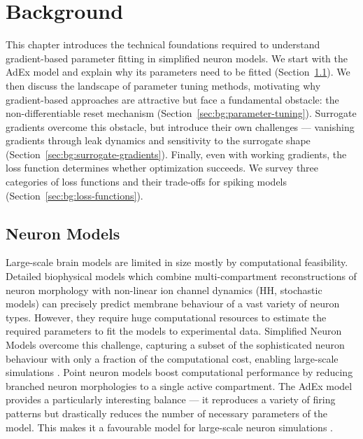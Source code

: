 \section{Background}\label{ch:background}
\glsresetall
This chapter introduces the technical foundations required to understand gradient-based parameter fitting in simplified neuron models.
We start with the \gls{AdEx} model and explain why its parameters need to be fitted (Section~\ref{sec:bg:neuron-models}).
We then discuss the landscape of parameter tuning methods, motivating why gradient-based approaches are attractive but face a fundamental obstacle:
the non-differentiable reset mechanism (Section~\ref{sec:bg:parameter-tuning}).
Surrogate gradients overcome this obstacle, but introduce their own challenges --- vanishing gradients through leak dynamics and sensitivity to the surrogate shape (Section~\ref{sec:bg:surrogate-gradients}).
Finally, even with working gradients, the loss function determines whether optimization succeeds.
We survey three categories of loss functions and their trade-offs for spiking models (Section~\ref{sec:bg:loss-functions}).

\subsection{Neuron Models}\label{sec:bg:neuron-models}
Large-scale brain models are limited in size mostly by computational feasibility.
Detailed biophysical models which combine multi-compartment reconstructions of neuron morphology
with non-linear ion channel dynamics (\gls{HH}, stochastic models)
can precisely predict membrane behaviour of a vast variety of neuron types.
However, they require huge computational resources to estimate the required parameters to fit the models to experimental data.
Simplified Neuron Models overcome this challenge, capturing a subset of the sophisticated neuron behaviour with only a fraction of the computational cost, enabling large-scale simulations \cite{Gerstner2014}.
Point neuron models boost computational performance by reducing branched neuron morphologies to a single active compartment.
The \gls{AdEx} model \cite{Naud2008} provides a particularly interesting balance --- it reproduces a variety of firing patterns but drastically reduces the number of necessary parameters of the model.
This makes it a favourable model for large-scale neuron simulations \cite{Tesler2024}.

